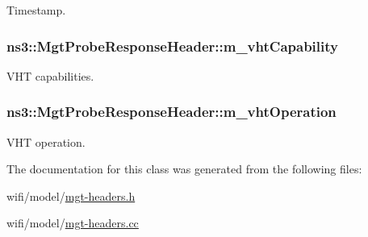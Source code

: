 Timestamp. 

\subsubsection[{\texorpdfstring{m\+\_\+vht\+Capability}{m_vhtCapability}}]{ ns3\+::\+Mgt\+Probe\+Response\+Header\+::m\+\_\+vht\+Capability\hspace{0.3cm}{\ttfamily [private]}}\hypertarget{classns3_1_1MgtProbeResponseHeader_a59bab09debd6d3ccb9a6df102a37a02d}{}\label{classns3_1_1MgtProbeResponseHeader_a59bab09debd6d3ccb9a6df102a37a02d}


V\+HT capabilities. 

\subsubsection[{\texorpdfstring{m\+\_\+vht\+Operation}{m_vhtOperation}}]{ ns3\+::\+Mgt\+Probe\+Response\+Header\+::m\+\_\+vht\+Operation\hspace{0.3cm}{\ttfamily [private]}}\hypertarget{classns3_1_1MgtProbeResponseHeader_a02d6b449ac57db6ce584a6a969258fde}{}\label{classns3_1_1MgtProbeResponseHeader_a02d6b449ac57db6ce584a6a969258fde}


V\+HT operation. 



The documentation for this class was generated from the following files\+:\begin{DoxyCompactItemize}
\item 
wifi/model/\hyperlink{mgt-headers_8h}{mgt-\/headers.\+h}\item 
wifi/model/\hyperlink{mgt-headers_8cc}{mgt-\/headers.\+cc}\end{DoxyCompactItemize}
